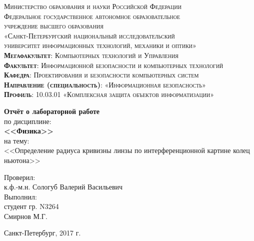 \begin{titlepage}
	\begin{center}
		\textsc{
			\fontsize{12pt}{14pt}\selectfont
			Министерство образования и науки Российской Федерации\\
			Федеральное государственное автономное образовательное\\
			учреждение высшего образования\\
			«Санкт-Петербургский национальный исследовательский\\
			университет информационных технологий, механики и оптики»\\
			\textbf{Мегафакультет}:  Компьютерных технологий и Управления\\
			\textbf{Факультет}: Информационной безопасности и компьютерных технологий\\
			\textbf{Кафедра}: Проектирования и безопасности компьютерных систем\\
			\textbf{Направление (специальность)}: «Информационная безопасность»\\
			\textbf{Профиль}: 10.03.01 «Комплексная защита объектов информатизации»}

		\vfill

		\textbf{Отчёт о лабораторной работе}\\
		по дисциплине:\\
		\textbf{<<Физика>>}\\
		на тему:\\
		<<Определение радиуса кривизны линзы по интерференционной картине колец ньютона>>\\
	\end{center}

	\hfill
	\begin{flushright}
		Проверил:\\[2mm] 
		к.ф.-м.н. Сологуб Валерий Васильевич\\[2mm] 

		Выполнил:\\
		студент гр.  N3264\\
		Смирнов М.Г.\\[2mm]

	\end{flushright}%
	\vfill
	\begin{center}
		Санкт-Петербург, 2017 г.
	\end{center}
\end{titlepage}

